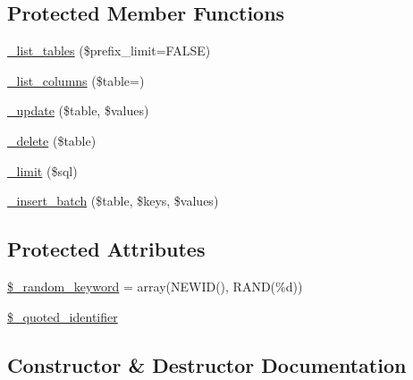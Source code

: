\subsection*{Protected Member Functions}
\begin{DoxyCompactItemize}
\item 
\mbox{\hyperlink{class_c_i___d_b__pdo__sqlsrv__driver_a435c0f3ce54fe7daa178baa8532ebd54}{\+\_\+list\+\_\+tables}} (\$prefix\+\_\+limit=F\+A\+L\+SE)
\item 
\mbox{\hyperlink{class_c_i___d_b__pdo__sqlsrv__driver_a7ccb7f9c301fe7f0a9db701254142b63}{\+\_\+list\+\_\+columns}} (\$table=\textquotesingle{}\textquotesingle{})
\item 
\mbox{\hyperlink{class_c_i___d_b__pdo__sqlsrv__driver_a2540b03a93fa73ae74c10d0e16fc073e}{\+\_\+update}} (\$table, \$values)
\item 
\mbox{\hyperlink{class_c_i___d_b__pdo__sqlsrv__driver_a133ea8446ded52589bd22cc9163d0896}{\+\_\+delete}} (\$table)
\item 
\mbox{\hyperlink{class_c_i___d_b__pdo__sqlsrv__driver_a3a02ea06541b8ecc25a33a61651562c8}{\+\_\+limit}} (\$sql)
\item 
\mbox{\hyperlink{class_c_i___d_b__pdo__sqlsrv__driver_a1978e1358c812587a46e242630365099}{\+\_\+insert\+\_\+batch}} (\$table, \$keys, \$values)
\end{DoxyCompactItemize}
\subsection*{Protected Attributes}
\begin{DoxyCompactItemize}
\item 
\mbox{\hyperlink{class_c_i___d_b__pdo__sqlsrv__driver_a10213aa6e05f6d924d3277bb1d2fea00}{\$\+\_\+random\+\_\+keyword}} = array(\textquotesingle{}N\+E\+W\+ID()\textquotesingle{}, \textquotesingle{}R\+A\+ND(\%d)\textquotesingle{})
\item 
\mbox{\hyperlink{class_c_i___d_b__pdo__sqlsrv__driver_a1dae2f0e9ad7299438a9976d6cdbf2ad}{\$\+\_\+quoted\+\_\+identifier}}
\end{DoxyCompactItemize}


\subsection{Constructor \& Destructor Documentation}
\mbox{\label{class_c_i___d_b__pdo__sqlsrv__driver_a9162320adff1a1a4afd7f2372f753a3e}} 
